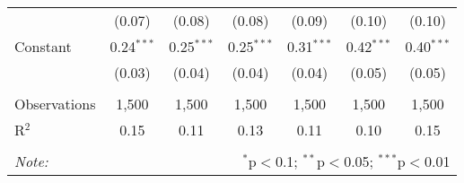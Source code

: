 \documentclass[
]{article}
\begin{document}
\begin{sidewaystable}[!htbp]
\begin{tabular}{@{\extracolsep{1pt}}lcccccc}
  & (0.07) & (0.08) & (0.08) & (0.09) & (0.10) & (0.10) \\ 
  Constant & 0.24$^{***}$ & 0.25$^{***}$ & 0.25$^{***}$ & 0.31$^{***}$ & 0.42$^{***}$ & 0.40$^{***}$ \\ 
  & (0.03) & (0.04) & (0.04) & (0.04) & (0.05) & (0.05) \\ 
 \hline \\[-1.8ex] 
Observations & 1,500 & 1,500 & 1,500 & 1,500 & 1,500 & 1,500 \\ 
R$^{2}$ & 0.15 & 0.11 & 0.13 & 0.11 & 0.10 & 0.15 \\ 
\hline 
\hline \\[-1.8ex] 
\textit{Note:}  & \multicolumn{6}{r}{$^{*}$p$<$0.1; $^{**}$p$<$0.05; $^{***}$p$<$0.01} \\ 
\end{tabular} 
\end{sidewaystable}
\end{document}
